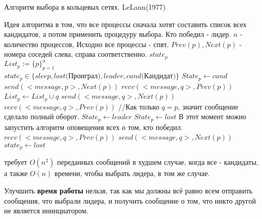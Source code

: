 \begin{algorithm}
\caption{Алгоритм выбора в кольцевых сетях. LeLann(1977)}
\label{algLeLann}
\begin{algorithmic}
\State Идея алгоритма в том, что все процессы сначала хотят составить список всех кандидатов, а потом применить процедуру выбора. Кто победил - лидер. 
\Require $n$ - количество процессов, Исходно все процессы - спят. $Prev(p), Next(p)$ - номера соседей слева, справа соответственно.
\Ensure $state_p$\\
$List_p:=\{p\}_{p=1}^n$ \\ 
$state_p \in \{sleep, lost\text{(Проиграл)}, leader, cand\text{(Кандидат)}\}$ 
 
    \State $State_p \gets cand$
    \State $send(<message, p>, Next(p))$ 
    \State $recv(<message, q>, Prev(p))$ 
     
        \State $List_p \gets List_p \cup {q}$
        \State $send(<message, q>, Next(p))$ 
        \State $recv(<message, q>, Prev(p))$ 
        \State //Как только $q = p$, значит сообщение сделало полный оборот.
    \EndWhile
     
        \State $State_p \gets leader$
    \Else 
        \State $State_p \gets lost$
    \EndIf
    \State В этот момент можно запустить алгоритм оповещения всех о том, кто победил.
\Else[Не инициаторы] 
        \State $recv(<message, q>, Prev(p))$ 
        \State $send(<message, q>, Next(p))$ 
            \State $state_p \gets lost$
        \EndIf
    \EndWhile
\EndIf 
\end{algorithmic}
\end{algorithm}
 требует $O(n^2)$ переданных сообщений в худшем случае, когда все - кандидаты, а также $O(n)$ времени, чтобы выбрать лидера, в том же случае.

Улучшить \textbf{время работы} нельзя, так как мы должны всё равно всем отправить сообщения, что выбрали лидера, и получить сообщение о том, что никто другой не является ининциатором.

